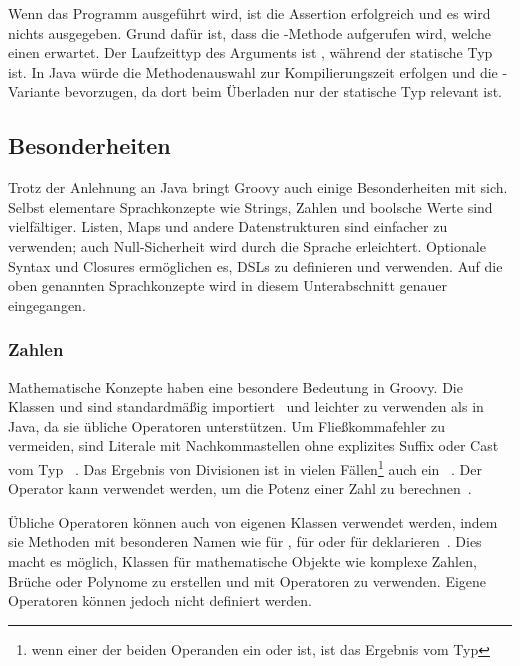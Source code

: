 
Wenn das Programm ausgeführt wird, ist die Assertion erfolgreich und es wird nichts ausgegeben.
Grund dafür ist, dass die -Methode aufgerufen wird, welche einen  erwartet.
Der Laufzeittyp des Arguments  ist , während der statische Typ  ist.
In Java würde die Methodenauswahl zur Kompilierungszeit erfolgen und die -Variante bevorzugen, da dort beim Überladen nur der statische Typ relevant ist.

\subsection{Besonderheiten}\label{subsec:besonderheiten}

Trotz der Anlehnung an Java bringt Groovy auch einige Besonderheiten mit sich.
Selbst elementare Sprachkonzepte wie Strings, Zahlen und boolsche Werte sind vielfältiger.
Listen, Maps und andere Datenstrukturen sind einfacher zu verwenden; auch Null-Sicherheit wird durch die Sprache erleichtert.
Optionale Syntax und Closures ermöglichen es, DSLs zu definieren und verwenden.
Auf die oben genannten Sprachkonzepte wird in diesem Unterabschnitt genauer eingegangen.

\subsubsection{Zahlen}\label{subsubsec:zahlen}

Mathematische Konzepte haben eine besondere Bedeutung in Groovy.
Die Klassen  und  sind standardmäßig importiert~\cite[{Abs.} 1.]{groovy-lang:differences} und leichter zu verwenden als in Java, da sie übliche Operatoren unterstützen.
Um Fließkommafehler zu vermeiden, sind Literale mit Nachkommastellen ohne explizites Suffix oder Cast vom Typ ~\cite[{Abs.} 5.2.]{groovy-lang:syntax}.
Das Ergebnis von Divisionen ist in vielen Fällen\footnote{wenn einer der beiden Operanden ein  oder  ist, ist das Ergebnis vom Typ } auch ein ~\cite[{Abs.} 5.5.1.]{groovy-lang:syntax}.
Der Operator \code{**} kann verwendet werden, um die Potenz einer Zahl zu berechnen~\cite[{Abs.} 5.5.2.]{groovy-lang:syntax}.

Übliche Operatoren können auch von eigenen Klassen verwendet werden, indem sie Methoden mit besonderen Namen wie  für \code{+},  für \code{<<} oder  für \code{++} deklarieren~\cite[{Abs.} 10.]{groovy-lang:operators}.
Dies macht es möglich, Klassen für mathematische Objekte wie komplexe Zahlen, Brüche oder Polynome zu erstellen und mit Operatoren zu verwenden.
Eigene Operatoren können jedoch nicht definiert werden.

